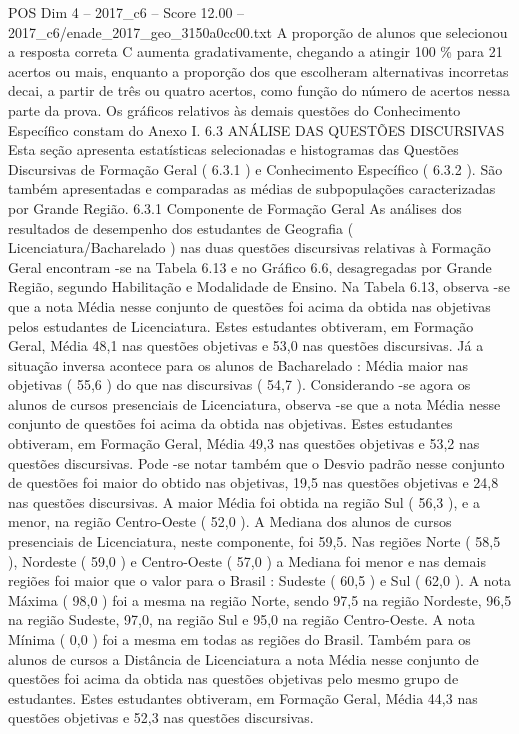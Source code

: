 \begin{textsample}{POS Dim 4 – 2017\_c6 – Score 12.00 – 2017\_c6/enade\_2017\_geo\_3150a0cc00.txt}
A proporção de alunos que selecionou a resposta correta C aumenta gradativamente, chegando a atingir 100 \% para 21 acertos ou mais, enquanto a proporção dos que escolheram alternativas incorretas decai, a partir de três ou quatro acertos, como função do número de acertos nessa parte da prova.
Os gráficos relativos às demais questões do Conhecimento Específico constam do Anexo I. 6.3 ANÁLISE DAS QUESTÕES DISCURSIVAS Esta seção apresenta estatísticas selecionadas e histogramas das Questões Discursivas de Formação Geral ( 6.3.1 ) e Conhecimento Específico ( 6.3.2 ).
São também apresentadas e comparadas as médias de subpopulações caracterizadas por Grande Região. 6.3.1 Componente de Formação Geral As análises dos resultados de desempenho dos estudantes de Geografia ( Licenciatura/Bacharelado ) nas duas questões discursivas relativas à Formação Geral encontram -se na Tabela 6.13 e no Gráfico 6.6, desagregadas por Grande Região, segundo Habilitação e Modalidade de Ensino.
Na Tabela 6.13, observa -se que a nota Média nesse conjunto de questões foi acima da obtida nas objetivas pelos estudantes de Licenciatura.
Estes estudantes obtiveram, em Formação Geral, Média 48,1 nas questões objetivas e 53,0 nas questões discursivas.
Já a situação inversa acontece para os alunos de Bacharelado : Média maior nas objetivas ( 55,6 ) do que nas discursivas ( 54,7 ).
Considerando -se agora os alunos de cursos presenciais de Licenciatura, observa -se que a nota Média nesse conjunto de questões foi acima da obtida nas objetivas.
Estes estudantes obtiveram, em Formação Geral, Média 49,3 nas questões objetivas e 53,2 nas questões discursivas.
Pode -se notar também que o Desvio padrão nesse conjunto de questões foi maior do obtido nas objetivas, 19,5 nas questões objetivas e 24,8 nas questões discursivas.
A maior Média foi obtida na região Sul ( 56,3 ), e a menor, na região Centro-Oeste ( 52,0 ).
A Mediana dos alunos de cursos presenciais de Licenciatura, neste componente, foi 59,5.
Nas regiões Norte ( 58,5 ), Nordeste ( 59,0 ) e Centro-Oeste ( 57,0 ) a Mediana foi menor e nas demais regiões foi maior que o valor para o Brasil : Sudeste ( 60,5 ) e Sul ( 62,0 ).
A nota Máxima ( 98,0 ) foi a mesma na região Norte, sendo 97,5 na região Nordeste, 96,5 na região Sudeste, 97,0, na região Sul e 95,0 na região Centro-Oeste.
A nota Mínima ( 0,0 ) foi a mesma em todas as regiões do Brasil.
Também para os alunos de cursos a Distância de Licenciatura a nota Média nesse conjunto de questões foi acima da obtida nas questões objetivas pelo mesmo grupo de estudantes.
Estes estudantes obtiveram, em Formação Geral, Média 44,3 nas questões objetivas e 52,3 nas questões discursivas.

\end{textsample}
